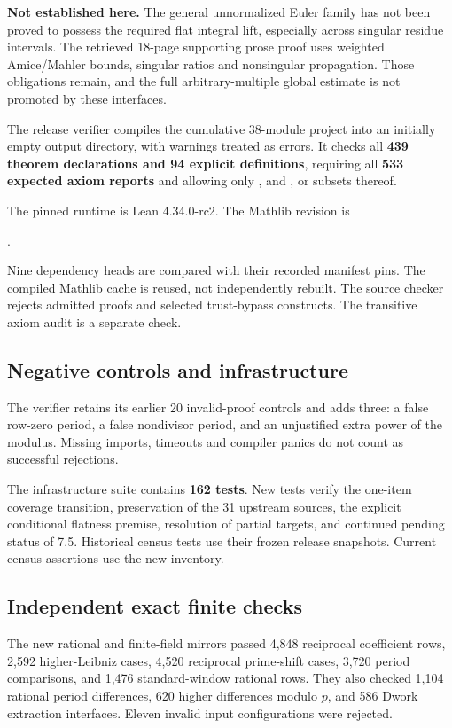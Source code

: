 \textbf{Not established here.} The general unnormalized Euler family has not been proved to possess the required flat integral lift, especially across singular residue intervals. The retrieved 18-page supporting prose proof uses weighted Amice/Mahler bounds, singular ratios and nonsingular propagation. Those obligations remain, and the full arbitrary-multiple global estimate is not promoted by these interfaces.

\par\medskip
{}
The release verifier compiles the cumulative 38-module project into an initially empty output directory, with warnings treated as errors. It checks all \textbf{439 theorem declarations and 94 explicit definitions}, requiring all \textbf{533 expected axiom reports} and allowing only ,  and , or subsets thereof.

The pinned runtime is Lean 4.34.0-rc2. The Mathlib revision is
\begin{center}\footnotesize{}.\end{center}
Nine dependency heads are compared with their recorded manifest pins. The compiled Mathlib cache is reused, not independently rebuilt. The source checker rejects admitted proofs and selected trust-bypass constructs. The transitive axiom audit is a separate check.

\subsection*{Negative controls and infrastructure}
The verifier retains its earlier 20 invalid-proof controls and adds three: a false row-zero period, a false nondivisor period, and an unjustified extra power of the modulus. Missing imports, timeouts and compiler panics do not count as successful rejections.

The infrastructure suite contains \textbf{162 tests}. New tests verify the one-item coverage transition, preservation of the 31 upstream sources, the explicit conditional flatness premise, resolution of partial targets, and continued pending status of 7.5. Historical census tests use their frozen release snapshots. Current census assertions use the new inventory.

\subsection*{Independent exact finite checks}
The new rational and finite-field mirrors passed 4,848 reciprocal coefficient rows, 2,592 higher-Leibniz cases, 4,520 reciprocal prime-shift cases, 3,720 period comparisons, and 1,476 standard-window rational rows. They also checked 1,104 rational period differences, 620 higher differences modulo $p$, and 586 Dwork extraction interfaces. Eleven invalid input configurations were rejected.


